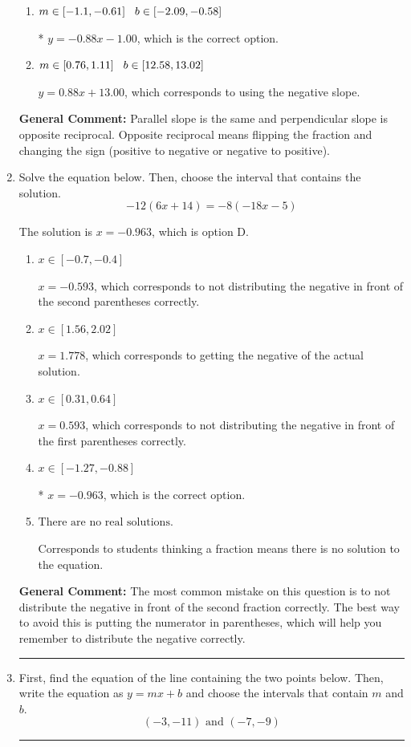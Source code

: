 \documentclass{extbook}[14pt]
\newcommand{\litem}[1]{\item #1

\rule{\textwidth}{0.4pt}}
\begin{document}
\begin{enumerate}
{\begin{enumerate}[label=\Alph*.]
 $y = -0.88x + 14.00$, which corresponds to correct slope and mis-distributing while simplifying to slope-intercept form.
\item \( m \in [-1.1, -0.61] \hspace*{3mm} b \in [-2.09, -0.58] \)

* $y = -0.88x - 1.00$, which is the correct option.
\item \( m \in [0.76, 1.11] \hspace*{3mm} b \in [12.58, 13.02] \)

 $y = 0.88x + 13.00$, which corresponds to using the negative slope.
\end{enumerate}

\textbf{General Comment:} Parallel slope is the same and perpendicular slope is opposite reciprocal. Opposite reciprocal means flipping the fraction and changing the sign (positive to negative or negative to positive).
}
\litem{
Solve the equation below. Then, choose the interval that contains the solution.
\[ -12(6x + 14) = -8(-18x -5) \]

The solution is \( x = -0.963 \), which is option D.\begin{enumerate}[label=\Alph*.]
\item \( x \in [-0.7, -0.4] \)

$x = -0.593$, which corresponds to not distributing the negative in front of the second parentheses correctly.
\item \( x \in [1.56, 2.02] \)

$x = 1.778$, which corresponds to getting the negative of the actual solution.
\item \( x \in [0.31, 0.64] \)

$x = 0.593$, which corresponds to not distributing the negative in front of the first parentheses correctly.
\item \( x \in [-1.27, -0.88] \)

* $x = -0.963$, which is the correct option.
\item \( \text{There are no real solutions.} \)

Corresponds to students thinking a fraction means there is no solution to the equation.
\end{enumerate}

\textbf{General Comment:} The most common mistake on this question is to not distribute the negative in front of the second fraction correctly. The best way to avoid this is putting the numerator in parentheses, which will help you remember to distribute the negative correctly.
}
\litem{
First, find the equation of the line containing the two points below. Then, write the equation as $ y=mx+b $ and choose the intervals that contain $m$ and $b$.
\[ (-3, -11) \text{ and } (-7, -9) \]

}
\end{enumerate}
\end{document}
